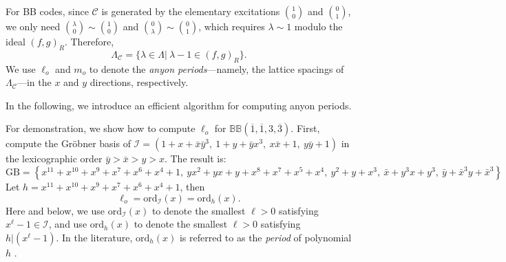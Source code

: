 \documentclass[aps,prl,english,superscriptaddress,twocolumn,tightenlines,showpacs,longbibliography,floatfix,amsfonts]{revtex4-2}
\begin{document}
For BB codes, since $\mathscr{C}$ is generated by the elementary excitations ${1 \choose 0}$ and ${0 \choose 1}$, we only need ${\lambda \choose 0} \sim {1 \choose 0}$ and ${0 \choose \lambda} \sim {0 \choose 1}$, which requires $\lambda\sim 1$ modulo the ideal $(f,g)_R$. Therefore,
\begin{equation}
	\Lambda_\mathscr{C} =\{\lambda\in\Lambda |\ \lambda-1\in (f,g)_R\}.
\end{equation}
We use $\ell_o$ and $m_o$ to denote the \emph{anyon periods}---namely, the lattice spacings of $\Lambda_{\mathscr{C}}$---in the $x$ and $y$ directions, respectively. 


In the following, we introduce an efficient algorithm for computing anyon periods. 


For demonstration, we show how to compute $\ell_o$ for $\mathbb{BB}(\overline{1},\overline{1},3,\overline{3})$.  First, compute the Gr\"obner basis of $\mathcal{I}=(1+x+\bar{x}\bar{y}^3,\ 1+y+\bar{y}x^3,\ x\bar{x}+1,\ y\bar{y}+1)$ in the lexicographic order $\bar{y}>\bar{x}>y>x$. The result is:
\begin{equation}
	\text{GB}=\left\{x^{11} + x^{10} + x^9 + x^7 + x^6 + x^4 + 1,\ yx^2 + yx + y + x^8 + x^7 + x^5 + x^4,\ y^2 + y + x^3,\ \bar{x}+y^3x+y^3,\ \bar{y}+\bar{x}^3y+\bar{x}^3\right\}
\end{equation}
Let $h=x^{11} + x^{10} + x^9 + x^7 + x^6 + x^4 + 1$, then 
\begin{equation}
	\ell_o = \text{ord}_{\mathcal{I}}(x) = \text{ord}_h(x).
\end{equation}
Here and below, we use $\text{ord}_\mathcal{I}(x)$ to denote the smallest $\ell>0$ satisfying $x^\ell-1\in \mathcal{I}$, and use $\text{ord}_{h}(x)$ to denote the smallest $\ell>0$ satisfying $h | (x^\ell-1)$. In the literature, $\text{ord}_{h}(x)$ is referred to as the \textit{period} of polynomial $h$ \cite{ber84}.
\end{document}
